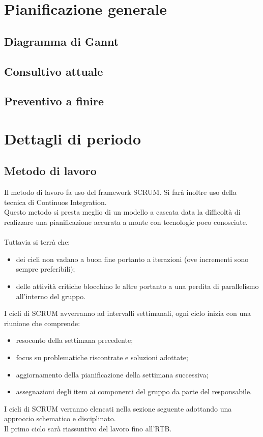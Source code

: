 \documentclass[a4paper, 12pt]{article}
\begin{document}
\makefrontpage

\makeversioni

\tableofcontents
\clearpage

\section{Pianificazione generale}
\subsection{Diagramma di Gannt}
\subsection{Consultivo attuale}
\subsection{Preventivo a finire}

\section{Dettagli di periodo}
\subsection{Metodo di lavoro}
Il metodo di lavoro fa uso del framework SCRUM. Si farà inoltre uso della tecnica di Continuos Integration.\\
Questo metodo si presta meglio di un modello a cascata data la difficoltà di realizzare una pianificazione accurata a monte con tecnologie poco conosciute.\\\\
Tuttavia si terrà che:
\begin{itemize} 
\item dei cicli non vadano a buon fine portanto a iterazioni (ove incrementi sono sempre preferibili);
\item delle attività critiche blocchino le altre portanto a una perdita di parallelismo all'interno del gruppo.
\end{itemize}
I cicli di SCRUM avverranno ad intervalli settimanali, ogni ciclo inizia con una riunione che comprende:
\begin{itemize}
\item resoconto della settimana precedente;
\item focus su problematiche riscontrate e soluzioni adottate;
\item aggiornamento della pianificazione della settimana successiva;
\item assegnazioni degli item ai componenti del gruppo da parte del responsabile.
\end{itemize}
I cicli di SCRUM verranno elencati nella sezione seguente adottando una approccio schematico e disciplinato.\\
Il primo ciclo sarà riassuntivo del lavoro fino all'RTB.
\end{document}
